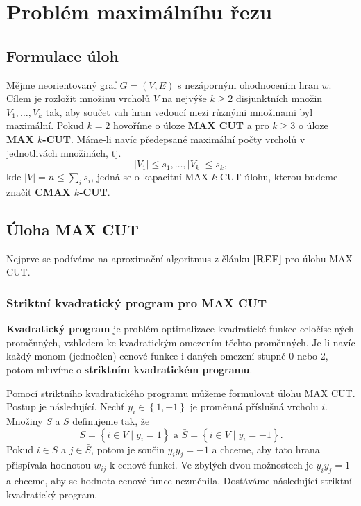 \chapter{Problém maximálníhu řezu}

\section{Formulace úloh}

Mějme neorientovaný graf $G = (V, E)$ s nezáporným ohodnocením hran $w$. Cílem je rozložit množinu vrcholů $V$ na nejvýše $k \geq 2$ disjunktních množin $V_1, \dots, V_k$ tak, aby součet vah hran vedoucí mezi různými množinami byl maximální. Pokud $k = 2$ hovoříme o úloze \textbf{MAX CUT} a pro $k \geq 3$ o úloze \textbf{MAX $k$-CUT}. Máme-li navíc předepsané maximální počty vrcholů v jednotlivách množinách, tj.
$$
    |V_1| \leq s_1, \dots, |V_k| \leq s_k,
$$
kde $|V| = n \leq \sum_i s_i$, jedná se o kapacitní MAX $k$-CUT úlohu, kterou budeme značit \textbf{CMAX $k$-CUT}. 

\section{Úloha MAX CUT}

Nejprve se podíváme na aproximační algoritmus z článku \textbf{[REF]} pro úlohu MAX CUT.

\subsection{Striktní kvadratický program pro MAX CUT}

\textbf{Kvadratický program} je problém optimalizace kvadratické funkce celočíselných proměnných, vzhledem ke kvadratickým omezením těchto proměnných. Je-li navíc každý monom (jednočlen) cenové funkce i daných omezení stupně $0$ nebo $2$, potom mluvíme o \textbf{striktním kvadratickém programu}.

Pomocí striktního kvadratického programu můžeme formulovat úlohu MAX CUT. Postup je následující. Nechť $y_i \in \left\{ 1, -1 \right\}$ je proměnná příslušná vrcholu $i$. Množiny $S$ a $\bar{S}$ definujeme tak, že
$$
    S = \left\{ i \in V \mid y_i = 1 \right\} \text{ a } \bar{S} = \left\{ i \in V \mid y_i = -1 \right\}.
$$
Pokud $i \in S$ a $j \in \bar{S}$, potom je součin $y_i y_j = -1$ a chceme, aby tato hrana přispívala hodnotou $w_{ij}$ k cenové funkci. Ve zbylých dvou možnostech je $y_i y_j = 1$ a chceme, aby se hodnota cenové funce nezměnila. Dostáváme následující striktní kvadratický program.

